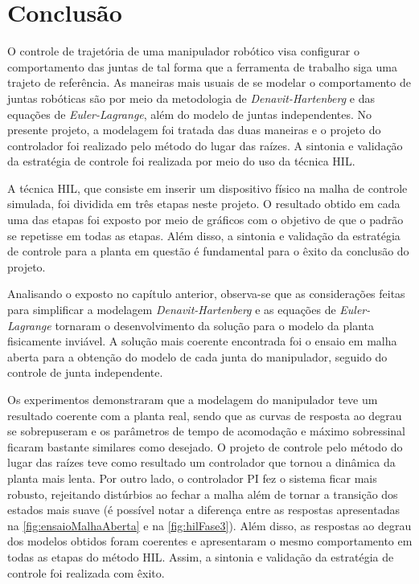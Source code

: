 \chapter{Conclusão}

O controle de trajetória de uma manipulador robótico visa configurar o comportamento das juntas de tal 
forma que a ferramenta de trabalho siga uma trajeto de referência.
As maneiras mais usuais de se modelar o comportamento de juntas robóticas são por meio da metodologia de
\textit{Denavit-Hartenberg} e das equações de \textit{Euler-Lagrange}, além do modelo de juntas independentes.
No presente projeto, a modelagem foi tratada das duas maneiras
e o projeto do controlador foi realizado pelo método do lugar das raízes. A sintonia e validação da estratégia de controle
foi realizada por meio do uso da técnica HIL.

A técnica HIL, que consiste em inserir um dispositivo físico na malha de controle simulada, foi dividida
em três etapas neste projeto. O resultado obtido em cada uma das etapas foi exposto por meio
de gráficos com o objetivo de que o padrão se repetisse em todas as etapas. Além disso, a sintonia
e validação da estratégia de controle para a planta em questão é fundamental para o êxito da 
conclusão do projeto.

Analisando o exposto no capítulo anterior, observa-se que as considerações feitas para simplificar
a modelagem \textit{Denavit-Hartenberg} e as equações de \textit{Euler-Lagrange} tornaram o desenvolvimento
da solução para o modelo da planta fisicamente inviável. A solução mais coerente encontrada foi o ensaio 
em malha aberta para a obtenção do modelo de cada junta do manipulador, seguido do controle de junta independente.

Os experimentos demonstraram que a modelagem do manipulador teve um resultado coerente com a planta real, sendo que as curvas
de resposta ao degrau se sobrepuseram e os parâmetros de tempo de acomodação e máximo sobressinal ficaram bastante similares como desejado. 
O projeto de controle pelo método do lugar das raízes teve como resultado um controlador que tornou a dinâmica da 
planta mais lenta. Por outro lado, o controlador PI fez o sistema ficar mais robusto, rejeitando distúrbios ao fechar
a malha além de tornar a transição dos estados mais suave (é possível notar a diferença entre as respostas apresentadas na 
\autoref{fig:ensaioMalhaAberta} e na \autoref{fig:hilFase3}). Além disso, as respostas ao degrau dos modelos obtidos
foram coerentes e apresentaram o mesmo comportamento em todas as etapas do método HIL. Assim, a sintonia e
validação da estratégia de controle foi realizada com êxito.

